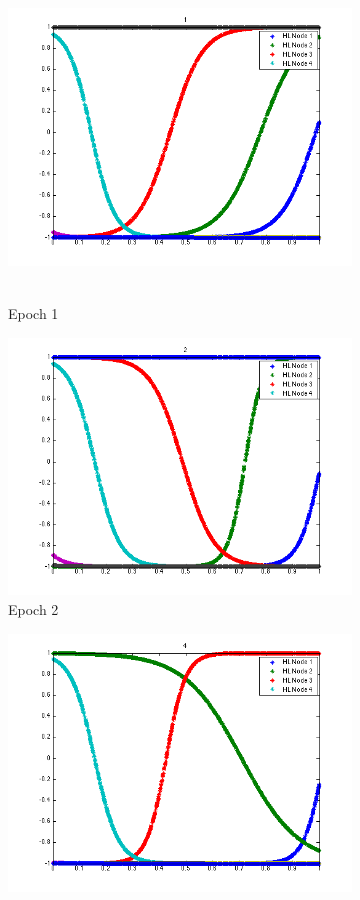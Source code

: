 \documentclass{article}
\begin{document}
\begin{figure}
\begin{subfigure}{.5\textwidth}
  \centering
  \includegraphics[width=.8\linewidth]{Regression/univariate/hiddenLayer_1.png}\
  \caption{Epoch 1}
\end{subfigure}%
\begin{subfigure}{.5\textwidth}
  \centering
  \includegraphics[width=.8\linewidth]{Regression/univariate/hiddenLayer_2.png}
   \caption{Epoch 2}
  \end{subfigure}
  \begin{subfigure}{.5\textwidth}
  \centering
  \includegraphics[width=.8\linewidth]{Regression/univariate/hiddenLayer_4.png}\

\end{subfigure}
\end{figure}
\end{document}
